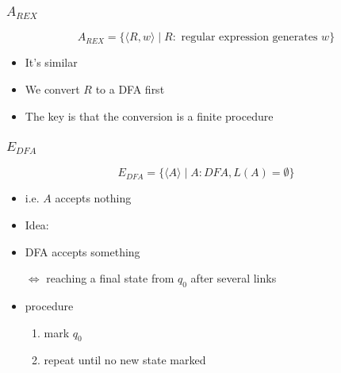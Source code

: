 \begin{frame}[allowframebreaks]
\begin{itemize}
\end{itemize}\end{frame} \begin{frame}[allowframebreaks] \frametitle{$A_{REX}$}
\begin{equation*}
  A_{REX}
=\{\langle  R,w\rangle \mid R: \mbox{ regular expression generates } w\}
\end{equation*}
  \begin{itemize}
\item It's similar
\item We convert $R$ to a DFA first
\item The key is that the conversion is a \alert{finite} procedure
\end{itemize}\end{frame} \begin{frame}[allowframebreaks] \frametitle{$E_{DFA}$}
\begin{equation*}
  E_{DFA}
=\{\langle  A\rangle 
\mid A: DFA, L(A)=\emptyset\}
\end{equation*}
  \begin{itemize}
\item i.e. $A$ accepts nothing
\item Idea:

\item [] DFA accepts something

$\Leftrightarrow$ reaching a final state from $q_0$ 
after several links
\item procedure
  \begin{enumerate}
  \item mark $q_0$
  \item repeat until no new state marked


\end{enumerate}
\end{itemize}
\end{frame}
